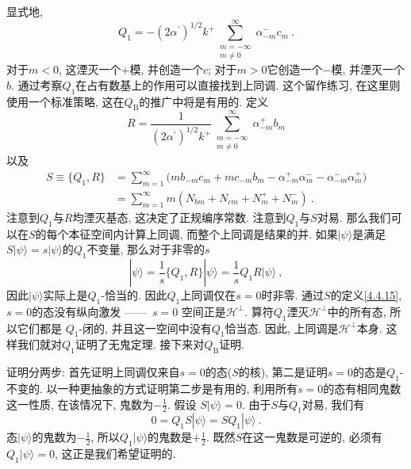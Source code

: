 显式地, 
\begin{equation}
Q_{1}=-(2 \alpha^{\prime})^{1 / 2} k^{+} \sum_{\substack{m=-\infty  \\  m \neq 0}}^{\infty} \alpha_{-m}^{-} c_{m} \:. \label{4.4.13}
\end{equation}
对于$m<0$, 这湮灭一个$+$模, 并创造一个$c$; 对于$m>0$它创造一个$-$模, 并湮灭一个$b$. 通过考察$Q_{1}$在占有数基上的作用可以直接找到上同调. 这个留作练习, 在这里则使用一个标准策略, 这在$Q_{\mathrm{B}}$的推广中将是有用的. 定义
\begin{equation}
R=\frac{1}{(2 \alpha^{\prime})^{1 / 2} k^{+}} \sum_{\substack{m=-\infty  \\  m \neq 0}}^{\infty} \alpha_{-m}^{+} b_{m} \label{4.4.14}
\end{equation}
以及
\begin{align}
S \equiv \{Q_{1}, R \} &=\sum_{m=1}^{\infty}\bigl(m b_{-m} c_{m}+m c_{-m} b_{m}-\alpha_{-m}^{+} \alpha_{m}^{-}-\alpha_{-m}^{-} \alpha_{m}^{+}\bigr)  \nonumber \\
&=\sum_{m=1}^{\infty} m(N_{b m}+N_{c m}+N_{m}^{+}+N_{m}^{-}) \:. \label{4.4.15}
\end{align}
注意到$Q_{1}$与$R$均湮灭基态, 这决定了正规编序常数. 注意到$Q_{1}$与$S$对易. 那么我们可以在$S$的每个本征空间内计算上同调, 而整个上同调是结果的并. 
如果$|\psi\rangle$是满足$S|\psi\rangle=s|\psi\rangle$的$Q_{1}$不变量, 那么对于非零的$s$
\begin{equation}
|\psi\rangle=\frac{1}{s}\{Q_{1}, R\}|\psi\rangle=\frac{1}{s} Q_{1} R|\psi\rangle \:, \label{4.4.16}
\end{equation}
因此$|\psi\rangle$实际上是$Q_{1}$-恰当的. 因此$Q_{1}$上同调仅在$s=0$时非零. 通过$S$的定义\eqref{4.4.15},  $s=0$的态没有纵向激发 ——\, $s=0$ 空间正是$\mathscr{H}^{\perp}$. 算符$Q_{1}$湮灭$\mathscr{H}^{\perp}$中的所有态, 所以它们都是 $Q_{1}$-闭的, 并且这一空间中没有$Q_{1}$恰当态. 因此, 上同调是$\mathscr{H}^{\perp}$本身. 
这样我们就对$Q_{1}$证明了无鬼定理. 接下来对$Q_{\mathrm{B}}$证明.

证明分两步: 首先证明上同调仅来自$s=0$的态($S$的核), 第二是证明$s=0$的态是$Q_{1}$-不变的. 以一种更抽象的方式证明第二步是有用的, 利用所有$s=0$的态有相同鬼数这一性质, 
在该情况下, 鬼数为$-\frac{1}{2}$. 假设 $S|\psi\rangle=0$. 由于$S$与$Q_{1}$对易, 我们有
\begin{equation}
0=Q_{1} S|\psi\rangle=S Q_{1}|\psi\rangle \:. \label{4.4.17}
\end{equation}
态$|\psi\rangle$的鬼数为$-\frac{1}{2}$, 所以$Q_{1}|\psi\rangle$的鬼数是$+\frac{1}{2}$. 既然$S$在这一鬼数是可逆的, 必须有$Q_{1}|\psi\rangle=0$, 这正是我们希望证明的.

